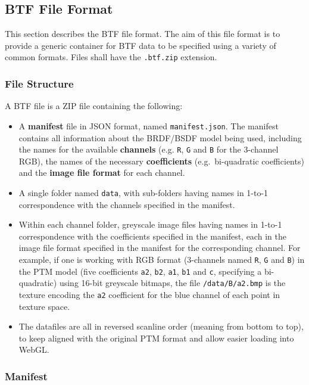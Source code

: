 \hypertarget{btf-file-format}{%
\subsection{BTF File Format}\label{btf-file-format}}

This section describes the BTF file format. The aim of this file format
is to provide a generic container for BTF data to be specified using a
variety of common formats. Files shall have the \texttt{.btf.zip}
extension.

\hypertarget{file-structure}{%
\subsubsection{File Structure}\label{file-structure}}

A BTF file is a ZIP file containing the following:
\begin{itemize}
\item A \textbf{manifest}
file in JSON format, named \texttt{manifest.json}. The manifest contains
all information about the BRDF/BSDF model being used, including the
names for the available \textbf{channels} (e.g. \texttt{R}, \texttt{G}
and \texttt{B} for the 3-channel RGB), the names of the necessary
\textbf{coefficients} (e.g.~bi-quadratic coefficients) and the
\textbf{image file format} for each channel.
\item A single folder named
\texttt{data}, with sub-folders having names in 1-to-1 correspondence
with the channels specified in the manifest.
\item Within each channel
folder, greyscale image files having names in 1-to-1 correspondence with
the coefficients specified in the manifest, each in the image file
format specified in the manifest for the corresponding channel. For
example, if one is working with RGB format (3-channels named \texttt{R},
\texttt{G} and \texttt{B}) in the PTM model (five coefficients
\texttt{a2}, \texttt{b2}, \texttt{a1}, \texttt{b1} and \texttt{c},\!
specifying a bi-quadratic) using 16-bit greyscale bitmaps, the file
\texttt{/data/B/a2.bmp} is the texture encoding the \texttt{a2}
coefficient for the blue channel of each point in texture space.
\item The
datafiles are all in reversed scanline order (meaning from bottom to
top), to keep aligned with the original PTM format and allow easier
loading into WebGL.
\end{itemize}

\hypertarget{manifest}{%
\subsubsection{Manifest}\label{manifest}}


